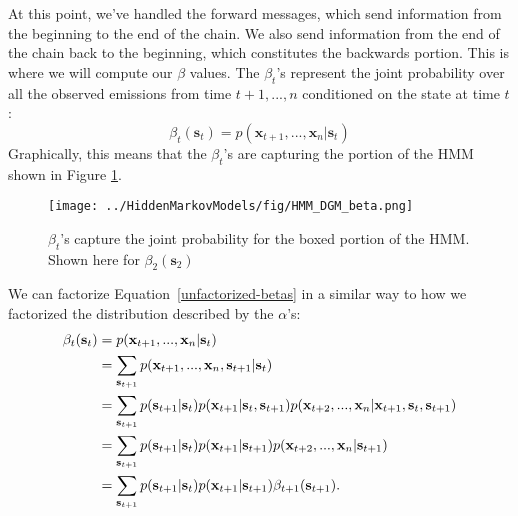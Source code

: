 
At this point, we've handled the forward messages, which send information from the beginning to the end of the chain. We also send information from the end of the chain back to the beginning, which constitutes the backwards portion. This is where we will compute our $\beta$ values.
%
The $\beta_t$'s represent the joint probability over all the observed emissions from time $t+1, ..., n$ conditioned on the state at time $t$:
\begin{equation} \label{unfactorized-betas}
	\beta_t(\textbf{s}_t) = p(\textbf{x}_{t+1}, ..., \textbf{x}_n | \textbf{s}_t)
\end{equation}
Graphically, this means that the $\beta_t$'s are capturing the portion of the HMM shown in Figure \ref{fig:HMM-DGM-beta}.
%
\begin{figure}[b!]
    \centering
    \texttt{[image: ../HiddenMarkovModels/fig/HMM\_DGM\_beta.png]}
    \caption{$\beta_t$'s capture the joint probability for the boxed portion of the HMM. Shown here for $\beta_2(\mathbf{s}_2)$} 
    \label{fig:HMM-DGM-beta}
\end{figure}



We can factorize Equation~\ref{unfactorized-betas} in a similar way to how we factorized the distribution described by the $\alpha$'s:
%
\begin{align}
  \beta_t(\textbf{s}_t) &= p(\textbf{x}_{t+1}, ..., \textbf{x}_n | \textbf{s}_t) \notag \\
&=\sum_{\textbf{s}_{t+1}} p(\textbf{x}_{t+1}, ..., \textbf{x}_n, \textbf{s}_{t+1} | \textbf{s}_t) 
 \label{eq:dcp1hmm} \\
                        &= \sum_{\textbf{s}_{t+1}} p(\textbf{s}_{t+1} | \textbf{s}_t) p(\textbf{x}_{t+1} | \textbf{s}_t, \textbf{s}_{t+1}) p(\textbf{x}_{t+2}, ..., \textbf{x}_n | \textbf{x}_{t+1}, \textbf{s}_t,\textbf{s}_{t+1}) \label{eq:dcp2hmm} \\
&  = \sum_{\textbf{s}_{t+1}} p(\textbf{s}_{t+1} | \textbf{s}_t) p(\textbf{x}_{t+1} | \textbf{s}_{t+1})
p(\textbf{x}_{t+2}, ..., \textbf{x}_n | \textbf{s}_{t+1})
  \label{eq:dcp3hmm}\\
	&= \sum_{\textbf{s}_{t+1}} p(\textbf{s}_{t+1} | \textbf{s}_t) p(\textbf{x}_{t+1} | \textbf{s}_{t+1}) \beta_{t+1}(\textbf{s}_{t+1}). \label{eq:dcp4hmm}
\end{align}

